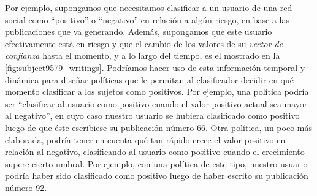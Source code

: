 Por ejemplo, supongamos que necesitamos clasificar a un usuario de una red social como ``positivo'' o ``negativo'' en relación a algún riesgo,  en base a las publicaciones que va generando.
Además, supongamos que este usuario efectivamente está en riesgo y que el cambio de los valores de su \emph{vector de confianza} hasta el momento, y a lo largo del tiempo, es el mostrado en la \autoref{fig:subject9579_writings}.
Podríamos hacer uso de esta información temporal y dinámica para diseñar políticas que le permitan al clasificador decidir en qué momento clasificar a los sujetos como positivos.
Por ejemplo, una política podría ser ``clasificar al usuario como positivo cuando el valor positivo actual sea mayor al negativo'', en cuyo caso nuestro usuario se hubiera clasificado como positivo luego de que éste escribiese su publicación número 66.
Otra política, un poco más elaborada, podría tener en cuenta qué tan rápido crece el valor positivo en relación al negativo, clasificando al usuario como positivo cuando el crecimiento supere cierto umbral. Por ejemplo, con una política de este tipo, nuestro usuario podría haber sido clasificado como positivo luego de haber escrito su publicación número 92.



